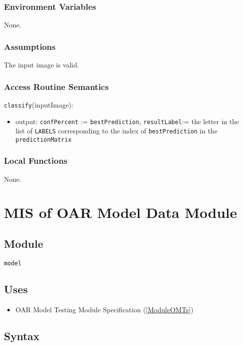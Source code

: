 \documentclass[12pt, titlepage]{article}
\def\code#1{\texttt{#1}}
\begin{document}
\subsubsection{Environment Variables}

None.

\subsubsection{Assumptions}

The input image is valid.

\subsubsection{Access Routine Semantics}

\noindent \code{classify}(inputImage):
\begin{itemize}
\item output: \code{confPercent} := \code{bestPrediction}, 
\code{resultLabel}:= the letter in the list of \code{LABELS} corresponding to the index of \code{bestPrediction} in the \code{predictionMatrix}
\end{itemize}

\subsubsection{Local Functions}

None.

\section{MIS of OAR Model Data Module} \label{ModuleOMD} 

\subsection{Module}

\code{model}

\subsection{Uses}

\begin{itemize}
  \item OAR Model Testing Module Specification (\ref{ModuleOMTs})
\end{itemize}

\subsection{Syntax}
\end{document}
